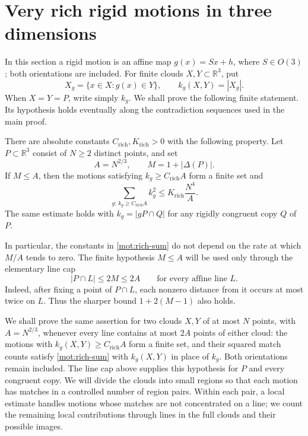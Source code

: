 \section{Very rich rigid motions in three dimensions}
\label{mot:section}

In this section a rigid motion is an affine map
\(g(x)=Sx+h\), where \(S\in O(3)\); both orientations are included.
For finite clouds \(X,Y\subset\mathbb R^3\), put
\[
 X_g=\{x\in X:g(x)\in Y\},
 \qquad k_g(X,Y)=|X_g|.
\]
When \(X=Y=P\), write simply \(k_g\).
We shall prove the following finite statement.  Its hypothesis holds
eventually along the contradiction sequences used in the main proof.

\begin{theorem}
\label{mot:rich}
There are absolute constants \(C_{\mathrm{rich}},K_{\mathrm{rich}}>0\)
with the following property.  Let \(P\subset\mathbb R^3\) consist of
\(N\ge2\) distinct points, and set
\[
 A=N^{2/3},\qquad M=1+|\Delta(P)|.
\]
If \(M\le A\), then the motions satisfying
\(k_g\ge C_{\mathrm{rich}}A\) form a finite set and
\begin{equation}
\label{mot:rich-sum}
 \sum_{g:\,k_g\ge C_{\mathrm{rich}}A} k_g^2
 \le K_{\mathrm{rich}}\frac{N^4}{A}.
\end{equation}
The same estimate holds with \(k_g=|gP\cap Q|\) for any rigidly
congruent copy \(Q\) of \(P\).
\end{theorem}

In particular, the constants in \eqref{mot:rich-sum} do not depend on
the rate at which \(M/A\) tends to zero.  The finite hypothesis
\(M\le A\) will be used only through the elementary line cap
\begin{equation}
\label{mot:physical-line-cap}
 |P\cap L|\le 2M\le2A
 \qquad\text{for every affine line }L.
\end{equation}
Indeed, after fixing a point of \(P\cap L\), each nonzero distance
from it occurs at most twice on \(L\).  Thus the sharper bound
\(1+2(M-1)\) also holds.

We shall prove the same assertion for two clouds \(X,Y\) of at most
\(N\) points, with \(A=N^{2/3}\), whenever every line contains at most
\(2A\) points of either cloud: the motions with
\(k_g(X,Y)\ge C_{\mathrm{rich}}A\) form a finite set, and their squared
match counts satisfy \eqref{mot:rich-sum} with \(k_g(X,Y)\) in place of
\(k_g\).  Both orientations remain included.  The line cap above
supplies this hypothesis for \(P\) and every congruent copy.  We will
divide the clouds into small regions so that each motion has matches in
a controlled number of region pairs.  Within each pair, a local estimate
handles motions whose matches are not concentrated on a line; we count
the remaining local contributions through lines in the full clouds and
their possible images.

